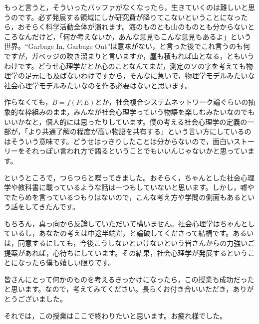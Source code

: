 \documentclass{ltjsbook}
\begin{document}
もっと言うと，そういったバッファがなくなったら，生きていくのは難しいと思うのです。必ず発展する領域にしか研究費が降りてこないということになったら，おそらく科学活動全体が潰れます。海のものとも山のものとも分からないところなんだけど，「何か考えないか，あんな意見もこんな意見もあるよ」という世界。``Garbage In, Garbage Out''は意味がない，と言った後でこれ言うのも何ですが，ガベッジの吹き溜まりと言いますか，塵も積もれば山となる，ともいうわけです。どうせ心理学だとか心のことなんてまだ，測定のソの字を考えても物理学の足元にも及ばないわけですから，そんなに急いで，物理学モデルみたいな社会心理学モデルみたいなのを作る必要はないと思います。

作らなくても，$B=f(P,E)$とか，社会複合システムネットワーク論ぐらいの抽象的な枠組みのまま，みんなが社会心理学っていう物語を楽しむみたいなのでもいいかなと，個人的には思ったりしています。僕の考える社会心理学の定義の一部が，「より共通了解の程度が高い物語を共有する」という言い方にしているのはそういう意味です。どうせはっきりしたことは分からないので，面白いストーリーをそれっぽい言われ方で語るということでもいいんじゃないかと思っています。

というところで，つらつらと喋ってきました。おそらく，ちゃんとした社会心理学や教科書に載っているような話は一つもしていないと思います。しかし，嘘やでたらめを言っているつもりはないので，こんな考え方や学問の側面もあるという話をしてきたんです。

もちろん，真っ向から反論していただいて構いません。社会心理学はちゃんとしているし，あなたの考えは中途半端だ，と論破してくださって結構です。あるいは，同意するにしても，今後こうしないといけないという皆さんからの力強いご提案があれば，心待ちにしています。その結果，社会心理学が発展するということになったら僕も嬉しい限りです。

皆さんにとって何かのものを考えるきっかけになったら，この授業も成功だったと思います。なので，考えてみてください。長らくお付き合いいただき，ありがとうございました。

それでは，この授業はここで終わりたいと思います。お疲れ様でした。

\printbibliography[title=引用文献]
\end{document}
